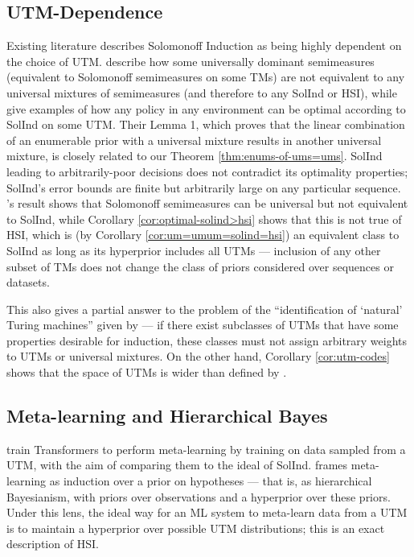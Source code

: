 \documentclass[11pt]{article}
\begin{document}
\subsection{UTM-Dependence}
Existing literature describes Solomonoff Induction as being highly dependent on the choice of UTM.
\citet{Wood2013} describe how some universally dominant semimeasures (equivalent to Solomonoff semimeasures on some TMs) are not equivalent to any universal mixtures of semimeasures (and therefore to any SolInd or HSI), while \citet{Leike2015} give examples of how any policy in any environment can be optimal according to SolInd on some UTM.
Their Lemma 1, which proves that the linear combination of an enumerable prior with a universal mixture results in another universal mixture, is closely related to our Theorem \ref{thm:enums-of-ums=ums}.
SolInd leading to arbitrarily-poor decisions does not contradict its optimality properties; SolInd's error bounds are finite but arbitrarily large on any particular sequence.
\citeauthor{Wood2013}'s result shows that Solomonoff semimeasures can be universal but not equivalent to SolInd, while Corollary \ref{cor:optimal-solind>hsi} shows that this is not true of HSI, which is (by Corollary \ref{cor:um=umum=solind=hsi}) an equivalent class to SolInd as long as its hyperprior includes all UTMs --- inclusion of any other subset of TMs does not change the class of priors considered over sequences or datasets.

This also gives a partial answer to the problem of the ``identification of `natural' Turing machines'' given by \citet{Hutter2009} --- if there exist subclasses of UTMs that have some properties desirable for induction, these classes must not assign arbitrary weights to UTMs or universal mixtures.
On the other hand, Corollary \ref{cor:utm-codes} shows that the space of UTMs is wider than defined by \citeauthor{Wood2013}.

\subsection{Meta-learning and Hierarchical Bayes}

\citet{Grau-Moya2024} train Transformers to perform meta-learning by training on data sampled from a UTM, with the aim of comparing them to the ideal of SolInd.
\citet{Baxter2000} frames meta-learning as induction over a prior on hypotheses --- that is, as hierarchical Bayesianism, with priors over observations and a hyperprior over these priors.
Under this lens, the ideal way for an ML system to meta-learn data from a UTM is to maintain a hyperprior over possible UTM distributions; this is an exact description of HSI.
\end{document}
